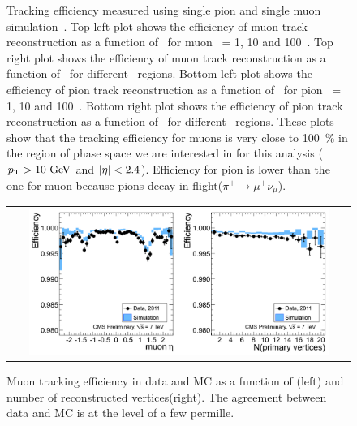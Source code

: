\begin{figure}[htp]
\begin{tabular}{c}
\end{tabular}
\caption{Tracking efficiency measured using single pion and single muon simulation~\cite{}. 
Top left plot shows the efficiency of muon track reconstruction as a function of \Eta\
for muon \pt\ = 1, 10 and 100~\GeV. 
Top right plot shows the efficiency of muon track reconstruction as a function of \pt\
for different \Eta\ regions. 
Bottom left plot shows the efficiency of pion track reconstruction as a function of \Eta\
for pion \pt\ = 1, 10 and 100~\GeV. 
Bottom right plot shows the efficiency of pion track reconstruction as a function of \pt\
for different \Eta\ regions. 
These plots show that the tracking efficiency for muons is very close to 100~\% 
in the region of phase space we are interested in for this analysis
($p_\mathrm{T}>10~\mathrm{Ge\kern -0.1em V}$ and $|\eta|<2.4$). Efficiency for pion is lower than the one for muon 
because pions decay in flight($\pi^+\to\mu^+\nu_\mu$).  
} 
\label{fig:TrackingEffMC} 
\end{figure} 

\begin{figure}[htp] 
\centering 
\begin{tabular}{c} 
\includegraphics[width=0.9\textwidth]{figures/MuonTagAndProbeEfficiency.png} 
\end{tabular} 
\caption{Muon tracking efficiency in data and MC as a function of 
\Eta(left) and number of reconstructed vertices(right). The agreement 
between data and MC is at the level of a few permille.} 
\label{fig:TrackingEffData} 
\end{figure} 



